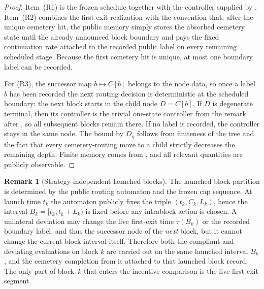 \documentclass[12pt]{article}
\theoremstyle{definition}
\newtheorem{remark}[theorem]{Remark}
\newcommand{\1}{\mathbf{1}}
\begin{document}
\begin{proof}
Item~(R1) is the frozen schedule together with the controller supplied by
. Item~(R2) combines the first-exit realization with
the convention that, after the unique cemetery hit, the public memory simply
stores the absorbed cemetery state until the already announced block boundary and
pays the fixed continuation rate attached to the recorded public label on every
remaining scheduled stage. Because the first cemetery hit is unique, at most one
boundary label can be recorded.

For (R3), the successor map $b\mapsto C[b]$ belongs to the node data, so once a
label $b$ has been recorded the next routing decision is deterministic at the
scheduled boundary: the next block starts in the child node $D=C[b]$. If $D$ is
degenerate terminal, then its controller is the trivial one-state controller from
the remark after , so all subsequent blocks remain
there. If no label is recorded, the controller stays in the same node. The bound
by $D_\eta$ follows from finiteness of the tree and the fact that every
cemetery-routing move to a child strictly decreases the remaining depth. Finite
memory comes from , and all relevant quantities are
publicly observable.
\end{proof}

\begin{remark}[Strategy-independent launched blocks]
\label{rem:strategy-independent-blocks}
The launched block partition is determined by the public routing automaton and
the frozen cap sequence. At launch time $t_k$ the automaton publicly fixes the
triple $(t_k,C_k,L_k)$, hence the interval $B_k=[t_k,t_k+L_k)$ is fixed before
any intrablock action is chosen. A unilateral deviation may change the live
first-exit time $\tau(B_k)$ or the recorded boundary label, and thus the
successor node of the \emph{next} block, but it cannot change the current block
interval itself. Therefore both the compliant and deviating evaluations on block
$k$ are carried out on the same launched interval $B_k$, and the cemetery
completion from  is attached to that launched block
record. The only part of block~$k$ that enters the incentive comparison is the
live first-exit segment.
\end{remark}
\end{document}
